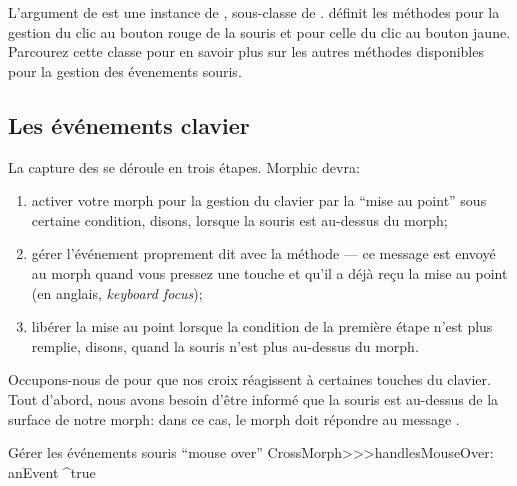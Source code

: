 \documentclass[a4paper,10pt,twoside]{book}
\begin{document}
L'argument  de  est une instance de
\mbox{,} sous-classe de .
 d\'efinit les m\'ethodes
 pour la gestion du clic au
bouton rouge de la souris et 
pour celle du clic au bouton jaune. Parcourez cette classe pour
en savoir plus sur les autres m\'ethodes disponibles pour la gestion
des \'evenements souris.

\subsection{Les \'ev\'enements clavier}

La capture des  se d\'eroule en trois
\'etapes. Morphic devra:


\begin{enumerate}
	\item activer votre morph pour la gestion du clavier par la ``mise au point'' sous certaine condition, disons, lorsque la souris est au-dessus du morph; 
	\item g\'erer l'\'ev\'enement proprement dit avec la m\'ethode
       --- ce message est envoy\'e au
      morph quand vous pressez une touche et qu'il a d\'ej\`a re\c{c}u
      la mise au point  (en anglais, \emph{keyboard focus});
	\item lib\'erer la mise au point lorsque la condition de la
      premi\`ere \'etape n'est plus remplie, disons, quand la souris
      n'est plus au-dessus du morph.
\end{enumerate}

Occupons-nous de  pour que nos croix r\'eagissent \`a
certaines touches du clavier. Tout d'abord, nous avons besoin d'\^etre
inform\'e que la souris est au-dessus de la surface de notre morph:
dans ce cas, le morph doit r\'epondre  au message
.


\begin{method}{G\'erer les \'ev\'enements souris ``mouse over''} 
CrossMorph>>>handlesMouseOver: anEvent
	^true
\end{method}
\end{document}
